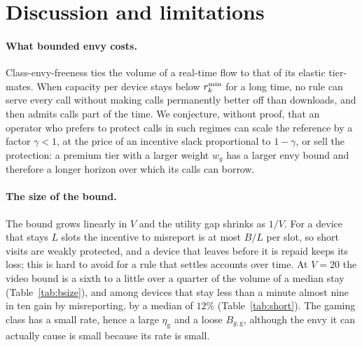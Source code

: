 \section{Discussion and limitations}\label{sec:discussion}

\paragraph{What bounded envy costs.}
Class-envy-freeness ties the volume of a real-time flow to that of its elastic tier-mates.
When capacity per device stays below $r^{\min}_k$ for a long time, no rule can serve every call without making calls permanently better off than downloads, and \repay{} then admits calls part of the time.
We conjecture, without proof, that an operator who prefers to protect calls in such regimes can scale the reference by a factor $\gamma<1$, at the price of an incentive slack proportional to $1-\gamma$, or sell the protection: a premium tier with a larger weight $w_g$ has a larger envy bound and therefore a longer horizon over which its calls can borrow.

\paragraph{The size of the bound.}
The bound grows linearly in $V$ and the utility gap shrinks as $1/V$.
For a device that stays $L$ slots the incentive to misreport is at most $B/L$ per slot, so short visits are weakly protected, and a device that leaves before it is repaid keeps its loss; this is hard to avoid for a rule that settles accounts over time. At $V=20$ the video bound is a sixth to a little over a quarter of the volume of a median stay (Table~\ref{tab:bsize}), and among devices that stay less than a minute almost nine in ten gain by misreporting, by a median of $12\%$ (Table~\ref{tab:short}).
The gaming class has a small rate, hence a large $\eta_{\mathrm{g}}$ and a loose $B_{g,\mathrm{g}}$, although the envy it can actually cause is small because its rate is small.


